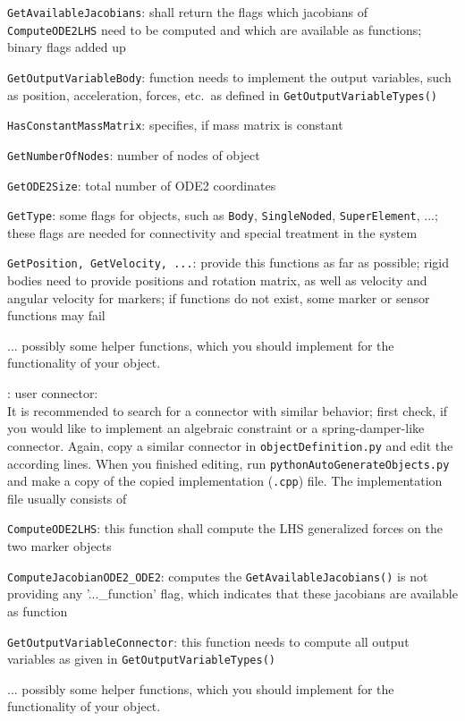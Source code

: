     \item \texttt{GetAvailableJacobians}: shall return the flags which jacobians of \texttt{ComputeODE2LHS} need to be computed and which are available as functions; binary flags added up
    \item \texttt{GetOutputVariableBody}: function needs to implement the output variables, such as position, acceleration, forces, etc.\ as defined in \texttt{GetOutputVariableTypes()}
    \item \texttt{HasConstantMassMatrix}: specifies, if mass matrix is constant
    \item \texttt{GetNumberOfNodes}: number of nodes of object
    \item \texttt{GetODE2Size}: total number of \ac{ODE2} coordinates
    \item \texttt{GetType}: some flags for objects, such as \texttt{Body}, \texttt{SingleNoded}, \texttt{SuperElement}, ...; these flags are needed for connectivity and special treatment in the system
    \item \texttt{GetPosition, GetVelocity, ...}: provide this functions as far as possible; rigid bodies need to provide positions and rotation matrix, as well as velocity and angular velocity for markers; if functions do not exist, some marker or sensor functions may fail
    \item ...   possibly some helper functions, which you should implement for the functionality of your object.
  \ei
  \item {}: user connector:\\
  It is recommended to search for a connector with similar behavior; first check, if you would like to implement 
  an algebraic constraint or a spring-damper-like connector.
  Again, copy a similar connector in \texttt{objectDefinition.py} and edit the according lines. 
  When you finished editing, run \texttt{pythonAutoGenerateObjects.py} and make a copy of the copied implementation (\texttt{.cpp}) file.
  The implementation file usually consists of
  \bi
    \item \texttt{ComputeODE2LHS}: this function shall compute the \ac{LHS} generalized forces on the two marker objects
    \item \texttt{ComputeJacobianODE2\_ODE2}: computes the \texttt{GetAvailableJacobians()} is not providing any '...\_function' flag, which indicates that these jacobians are available as function
    \item \texttt{GetOutputVariableConnector}: this function needs to compute all output variables as given in \texttt{GetOutputVariableTypes()}
    \item ...   possibly some helper functions, which you should implement for the functionality of your object.
  \ei
\ei




